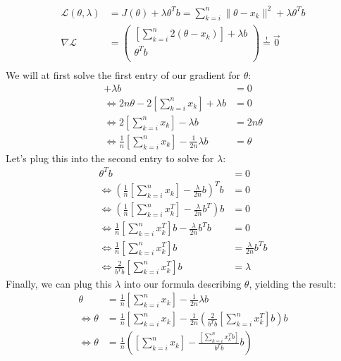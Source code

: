 \documentclass[10pt,a4paper]{article}
\begin{document}
\begin{enumerate}[(a)]
\begin{align*}
    \mathcal{L}(\theta,\lambda) &= J(\theta) + \lambda\theta^T b = \sum_{k = i}^{n} \|\theta-x_k\|^2 + \lambda\theta^T b \\
    \nabla\mathcal{L} &= \left(
        \begin{array}{c}
            [\sum_{k = i}^{n} 2(\theta-x_k)] + \lambda b\\
            \theta^T b\\
        \end{array}
    \right) \overset{!}{=} \vec{0} \\
\end{align*}
We will at first solve the first entry of our gradient for $\theta$:
\begin{align*}
    [\sum_{k = i}^{n} 2(\theta-x_k)] + \lambda b &= 0 \\
    \Leftrightarrow 2n\theta-2[\sum_{k = i}^{n}x_k] + \lambda b &= 0\\
    \Leftrightarrow 2[\sum_{k = i}^{n}x_k] - \lambda b &= 2n\theta\\
    \Leftrightarrow \frac{1}{n}[\sum_{k = i}^{n}x_k] - \frac{1}{2n}\lambda b &= \theta
\end{align*}
Let's plug this into the second entry to solve for $\lambda$:
\begin{align*}
    \theta^T b &= 0 \\
    \Leftrightarrow (\frac{1}{n}[\sum_{k = i}^{n}x_k] - \frac{\lambda}{2n}b)^T b &= 0\\
    \Leftrightarrow (\frac{1}{n}[\sum_{k = i}^{n}x_k^T] - \frac{\lambda}{2n} b^T) b &= 0\\
    \Leftrightarrow \frac{1}{n}[\sum_{k = i}^{n}x_k^T]b - \frac{\lambda}{2n} b^T b &= 0\\    
    \Leftrightarrow \frac{1}{n}[\sum_{k = i}^{n}x_k^T]b &= \frac{\lambda}{2n} b^T b\\ 
    \Leftrightarrow \frac{2}{b^T b}[\sum_{k = i}^{n}x_k^T]b &= \lambda
\end{align*}
Finally, we can plug this $\lambda$ into our formula describing $\theta$, yielding the result:
\begin{align*}
    \theta &= \frac{1}{n}[\sum_{k = i}^{n}x_k] - \frac{1}{2n}\lambda b \\
    \Leftrightarrow \theta &= \frac{1}{n}[\sum_{k = i}^{n}x_k] - \frac{1}{2n}(\frac{2}{b^T b}[\sum_{k = i}^{n}x_k^T]b) b \\
    \Leftrightarrow \theta &= \frac{1}{n}([\sum_{k = i}^{n}x_k] - \frac{[\sum_{k = i}^{n}x_k^Tb]}{b^T b} b) \\
\end{align*}


\end{enumerate}
\end{document}

